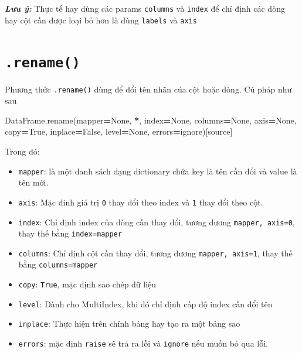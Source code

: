 \documentclass[
]{book}
\makeatletter
\newenvironment{Shaded}{\begin{snugshade}}{\end{snugshade}}
\newcommand{\NormalTok}[1]{#1}
\newcommand{\OperatorTok}[1]{\textcolor[rgb]{0.81,0.36,0.00}{\textbf{#1}}}
\newcommand{\StringTok}[1]{\textcolor[rgb]{0.31,0.60,0.02}{#1}}
\newcommand{\VariableTok}[1]{\textcolor[rgb]{0.00,0.00,0.00}{#1}}
\newenvironment{kframe}{%
\medskip{}
\setlength{\fboxsep}{.8em}
 \def\at@end@of@kframe{}%
 \ifinner\ifhmode%
  \def\at@end@of@kframe{\end{minipage}}%
  \begin{minipage}{\columnwidth}%
 \fi\fi%
 \def\FrameCommand##1{\hskip\@totalleftmargin \hskip-\fboxsep
 \colorbox{shadecolor}{##1}\hskip-\fboxsep
     \hskip-\linewidth \hskip-\@totalleftmargin \hskip\columnwidth}%
 \MakeFramed {\advance\hsize-\width
   \@totalleftmargin\z@ \linewidth\hsize
   \@setminipage}}%
 {\par\unskip\endMakeFramed%
 \at@end@of@kframe}
\newenvironment{rmdblock}[1]
  {
  \begin{itemize}
  \renewcommand{\labelitemi}{
    \raisebox{-.7\height}[0pt][0pt]{
      {\setkeys{Gin}{width=3em,keepaspectratio}\texttt{[image: images/\#1]}}
    }
  }
  \setlength{\fboxsep}{1em}
  \begin{kframe}
  \item
  }
  {
  \end{kframe}
  \end{itemize}
  }
\newenvironment{rmdnote}
  {\begin{rmdblock}{note}}
  {\end{rmdblock}}
\makeatother
\begin{document}
\begin{rmdnote}
\textbf{\emph{Lưu ý:}}
Thực tế hay dùng các params \texttt{columns} và \texttt{index} để chỉ định các dòng hay cột cần được loại bỏ hơn là dùng \texttt{labels} và \texttt{axis}
\end{rmdnote}

\section{\texorpdfstring{\texttt{.rename()}}{.rename()}}\label{rename}

Phương thức \texttt{.rename()} dùng để đổi tên nhãn của cột hoặc dòng. Cú pháp như sau

\begin{Shaded}
\begin{Highlighting}[]
\NormalTok{DataFrame.rename(mapper}\OperatorTok{=}\VariableTok{None}\NormalTok{, }\OperatorTok{*}\NormalTok{, index}\OperatorTok{=}\VariableTok{None}\NormalTok{, columns}\OperatorTok{=}\VariableTok{None}\NormalTok{, axis}\OperatorTok{=}\VariableTok{None}\NormalTok{, copy}\OperatorTok{=}\VariableTok{True}\NormalTok{, inplace}\OperatorTok{=}\VariableTok{False}\NormalTok{, level}\OperatorTok{=}\VariableTok{None}\NormalTok{, errors}\OperatorTok{=}\StringTok{\textquotesingle{}ignore\textquotesingle{}}\NormalTok{)[source]}
\end{Highlighting}
\end{Shaded}

Trong đó:

\begin{itemize}
\item
  \texttt{mapper}: là một danh sách dạng dictionary chứa key là tên cần đổi và value là tên mới.
\item
  \texttt{axis}: Mặc đinh giá trị \texttt{0} thay đổi theo index và \texttt{1} thay đổi theo cột.
\item
  \texttt{index}: Chỉ định index của dòng cần thay đổi, tương đương \texttt{mapper,\ axis=0}, thay thế bằng \texttt{index=mapper}
\item
  \texttt{columns}: Chỉ định cột cần thay đổi, tương đương \texttt{mapper,\ axis=1}, thay thế bằng \texttt{columns=mapper}
\item
  \texttt{copy}: \texttt{True}, mặc định sao chép dữ liệu
\item
  \texttt{level}: Dành cho MultiIndex, khi đó chỉ định cấp độ index cần đổi tên
\item
  \texttt{inplace}: Thực hiện trên chính bảng hay tạo ra một bảng sao
\item
  \texttt{errors}: mặc định \texttt{raise} sẽ trả ra lỗi và \texttt{ignore} nếu muốn bỏ qua lỗi.
\end{itemize}
\end{document}
